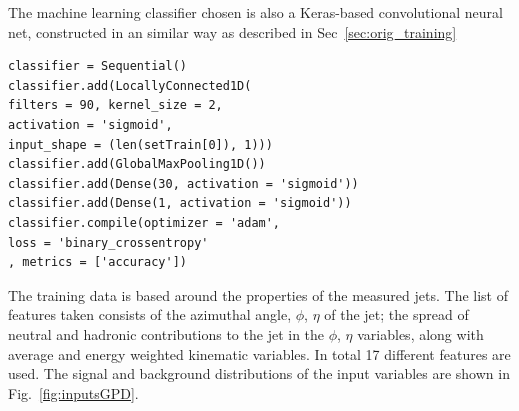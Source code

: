 \documentclass[final,5p,times,twocolumn]{elsarticle}
\begin{document}
The machine learning classifier chosen is also a Keras-based convolutional neural net,
constructed in an similar way as described in Sec~\ref{sec:orig_training}
\begin{lstlisting}
classifier = Sequential()
classifier.add(LocallyConnected1D(
filters = 90, kernel_size = 2,
activation = 'sigmoid',
input_shape = (len(setTrain[0]), 1)))
classifier.add(GlobalMaxPooling1D())
classifier.add(Dense(30, activation = 'sigmoid'))
classifier.add(Dense(1, activation = 'sigmoid'))
classifier.compile(optimizer = 'adam',
loss = 'binary_crossentropy'
, metrics = ['accuracy'])
\end{lstlisting}

The training data is based around the properties of the measured jets. The list of features
taken consists of the azimuthal angle, $\phi$, $\eta$ of the jet; the spread of neutral and 
hadronic contributions to the jet in the $\phi$, $\eta$ variables, along with average and energy weighted
kinematic variables. In total 17 different features are used.
The signal and background distributions of the input variables
are shown in Fig.~\ref{fig:inputsGPD}.
%
\end{document}
